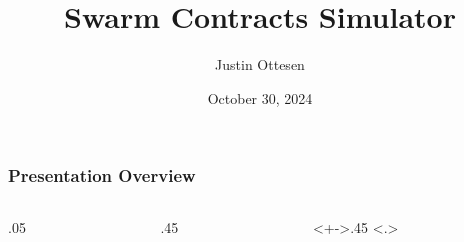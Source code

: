 \documentclass[
	10pt, %
	aspectratio=169, %
]{beamer}
\title[Swarm Contracts Simulator]{Swarm Contracts Simulator}
\author[]{Justin Ottesen} %
\institute[RPI]{Department of Computer Science}
\date[October 30, 2024]{October 30, 2024}
\begin{document}
\begin{frame}[plain]
	\titlepage %
\end{frame}



\begin{frame}[noframenumbering]
	\frametitle{Presentation Overview} %

	\begin{columns}[t]
		\begin{column}{.05\textwidth}
		\end{column}
		\begin{column}{.45\textwidth}
			\tableofcontents[
				sections={-2}
			]
		\end{column}
		\begin{column}<+->{.45\textwidth}
			\only<.>{\setcounter{tocseccounter}{\slideinframe}}
			\advanceslidecounter{-\thetocseccounter}
			\tableofcontents[
				sections={3-}
			]
		\end{column}
	\end{columns}

\end{frame}

\end{document}
